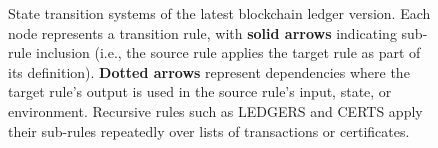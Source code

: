 \begin{figure}[h!]
\begin{tikzpicture}
  \end{tikzpicture}
  \caption{State transition systems of the latest blockchain ledger version.
  Each node represents a transition rule, with \textbf{solid arrows} indicating
  sub-rule inclusion (i.e., the source rule applies the target rule as part of its
  definition). \textbf{Dotted arrows} represent dependencies where the target rule’s
  output is used in the source rule’s input, state, or environment. Recursive rules
  such as LEDGERS and CERTS apply their sub-rules repeatedly over lists of transactions
  or certificates.}
  \label{fig:new-ledger-diagram}
\end{figure}
